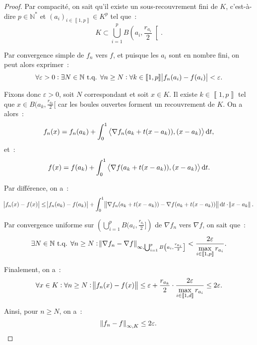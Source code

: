 \documentclass{report}
\theoremstyle{definition}
\theoremstyle{remark}
\numberwithin{equation}{section}
\newcommand{\N}{\mathbb N}
\newcommand{\tq}{\text{ t.q. }}
\newcommand{\intint}[2]{\left\llbracket#1, #2\right\rrbracket}
\newcommand{\scpr}[2]{\left\langle #1, #2\right\rangle}
\begin{document}
\begin{proof}
			Par compacité, on sait qu'il existe un sous-recouvrement fini de $K$, c'est-à-dire $p \in \N^*$ et $(a_i)_{i \in \intint 1p} \in K^p$ tel que~:
			\begin{equation}
				K \subset \bigcup_{i=1}^pB\left(a_i, \frac {r_{a_i}}2\right[.
			\end{equation}

			Par convergence simple de $f_n$ vers $f$, et puisque les $a_i$ sont en nombre fini, on peut alors exprimer~:
			\begin{equation}
				\forall \varepsilon > 0 : \exists N \in \N \tq \forall n \geq N : \forall k \in \intint 1p\abs {f_n(a_i) - f(a_i)} < \varepsilon.
			\end{equation}

			Fixons donc $\varepsilon > 0$, soit $N$ correspondant et soit $x \in K$. Il existe $k \in \intint 1p$ tel que $x \in B(a_k, \frac {r_{a_k}}2[$ car
			les boules ouvertes forment un recouvrement de $K$. On a alors~:
			\begin{equation}
				f_n(x) = f_n(a_k) + \int_0^1\scpr {\nabla f_n(a_k + t(x - a_k))}{(x - a_k)}\dif t,
			\end{equation}
			et~:
			\begin{equation}
				f(x) = f(a_k) + \int_0^1\scpr {\nabla f(a_k + t(x - a_k))}{(x - a_k)}\dif t.
			\end{equation}

			Par différence, on a~:
			\begin{equation}
				\abs {f_n(x) - f(x)} \leq \abs {f_n(a_k) - f(a_k)} + \int_0^1\norm {\nabla f_n(a_k + t(x - a_k))
				- \nabla f(a_k + t(x - a_k))}\dif t \cdot \norm {x - a_k}.
			\end{equation}

			Par convergence uniforme sur $\left(\bigcup_{i=1}^pB(a_i, \frac {r_{a_i}}2]\right)$ de $\nabla f_n$ vers $\nabla f$, on sait que~:
			\begin{equation}
				\exists N \in \N \tq \forall n \geq N : \norm {\nabla f_n - \nabla f}_{\infty, \bigcup_{i=1}^pB\left(a_i, \frac {r_{a_i}}2\right]} <
				\frac {2\varepsilon}{\displaystyle \max_{i \in \intint 1p} r_{a_i}}.
			\end{equation}

			Finalement, on a~:
			\begin{equation}
				\forall x \in K : \forall n \geq N : \norm {f_n(x) - f(x)} \leq
				\varepsilon + \frac {r_{a_k}}{2} \cdot \frac {2\varepsilon}{\displaystyle \max_{i \in \intint 1d}r_{a_i}} \leq 2\varepsilon.
			\end{equation}

			Ainsi, pour $n \geq N$, on a~:
			\begin{equation}
				\norm {f_n - f}_{\infty, K} \leq 2\varepsilon.
			\end{equation}
			\end{proof}
\end{document}
